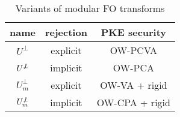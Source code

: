 \documentclass[journal=tches,submission]{iacrtrans}
\begin{document}
\begin{table}[H]
    \centering
    \begin{tabular}{|c|c|c|}
        \hline
        name & rejection & PKE security \\
        \hline
        $U^\bot$ & explicit & OW-PCVA \\
        \hline
        $U^{\not\bot}$ & implicit & OW-PCA \\
        \hline
        $U^\bot_m$ & explicit & OW-VA + rigid \\
        \hline
        $U^{\not\bot}_m$ & implicit & OW-CPA + rigid \\
        \hline
    \end{tabular}
    \caption{Variants of modular FO transforms}\label{tbl:fo-variations}
\end{table}
\end{document}
